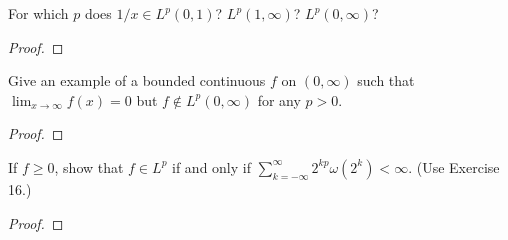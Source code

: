 \begin{problem}
For which $p$ does $1/x\in L^p(0,1)$? $L^p(1,\infty)$? $L^p(0,\infty)$?
\end{problem}
\begin{proof}
\end{proof}
\newpage

\begin{problem}
Give an example of a bounded continuous $f$ on $(0,\infty)$ such that
$\lim_{x\to\infty}f(x)=0$ but $f\notin L^p(0,\infty)$ for any $p>0$.
\end{problem}
\begin{proof}
\end{proof}
\newpage

\begin{problem}
If $f\geq 0$, show that $f\in L^p$ if and only if $\sum_{k=-\infty}^\infty
2^{kp}\omega(2^k)<\infty$. (Use Exercise 16.)
\end{problem}
\begin{proof}
\end{proof}

